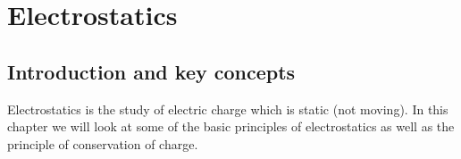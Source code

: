          \chapter{Electrostatics}
    \label{464e844ca5615087ea89d9d95dd9a43a}
         \section{Introduction and key concepts}
    \nopagebreak
    \label{m38780*cid2}
       
      \label{m38780*id200254}Electrostatics is the study of electric charge which is static (not moving). In this chapter we will look at some of the basic principles of electrostatics as well as the principle of conservation of charge. \par 
{}
    \label{m38780*cid3}
